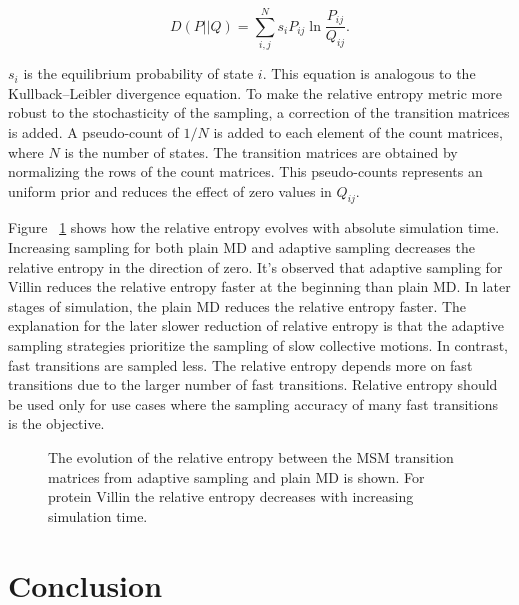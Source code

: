 \begin{equation}
D(P||Q)=\sum_{i,j}^{N}s_{i}P_{ij}\ln\frac{P_{ij}}{Q_{ij}}. 
\end{equation}

$s_{i}$ is the equilibrium probability of state $i$. This equation is analogous to the Kullback–Leibler divergence equation.
To make the relative entropy metric more robust to the stochasticity of the sampling, a correction of the transition matrices is added. A pseudo-count of $1/N$ is added to each element of the count matrices, where $N$ is the number of states. The transition matrices are obtained by normalizing the rows of the count matrices. This pseudo-counts represents an uniform prior and reduces the effect of zero values in $Q_{ij}$.

Figure ~\ref{fig:rel_ent} shows how the relative entropy evolves with absolute simulation time. Increasing sampling for both plain MD and adaptive sampling decreases the relative entropy in the direction of zero. It's observed that adaptive sampling for Villin reduces the relative entropy faster at the beginning than plain MD. In later stages of simulation, the plain MD reduces the relative entropy faster. The explanation for the later slower reduction of relative entropy is that the adaptive sampling strategies prioritize the sampling of slow collective motions. In contrast, fast transitions are sampled less. The relative entropy depends more on fast transitions due to the larger number of fast transitions. Relative entropy should be used only for use cases where the sampling accuracy of many fast transitions is the objective.

\begin{figure}[H]
   \centering
   \begin{subfigure}[b]{0.7\linewidth}
   {}
   \end{subfigure}%
   
  \caption{
  The evolution of the relative entropy between the MSM transition matrices from adaptive sampling and plain MD is shown. For protein Villin the relative entropy decreases with increasing simulation time.}
  \label{fig:rel_ent}
\end{figure}


\section{\label{sec:conclusion}Conclusion}

